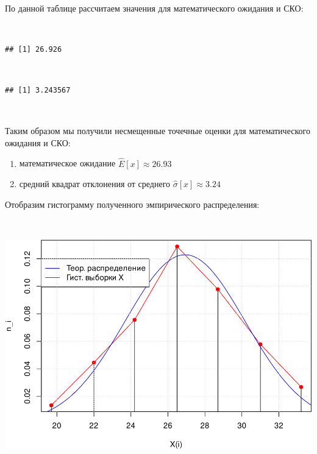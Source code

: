 \documentclass[
  14,
]{article}
\newenvironment{Shaded}{\begin{snugshade}}{\end{snugshade}}
\newcommand{\DecValTok}[1]{\textcolor[rgb]{0.00,0.00,0.81}{#1}}
\newcommand{\FunctionTok}[1]{\textcolor[rgb]{0.00,0.00,0.00}{#1}}
\newcommand{\NormalTok}[1]{#1}
\newcommand{\OtherTok}[1]{\textcolor[rgb]{0.56,0.35,0.01}{#1}}
\newcommand{\SpecialCharTok}[1]{\textcolor[rgb]{0.00,0.00,0.00}{#1}}
\begin{document}
\(\ \)

По данной таблице рассчитаем значения для математического ожидания и
СКО:

\(\ \)

\begin{Shaded}
\end{Shaded}

\begin{verbatim}
## [1] 26.926
\end{verbatim}

\(\ \)

\begin{Shaded}
\end{Shaded}

\begin{verbatim}
## [1] 3.243567
\end{verbatim}

\(\ \)

Таким образом мы получили несмещенные точечные оценки для
математического ожидания и СКО:

\begin{enumerate}
\def\labelenumi{\arabic{enumi}.}
\item
  математическое ожидание \(\hat{E}[x] \approx 26.93\)
\item
  средний квадрат отклонения от среднего
  \(\hat{\sigma}[x] \approx 3.24\)
\end{enumerate}

Отобразим гистограмму полученного эмпирического распределения:

\(\ \)

\begin{center}\includegraphics[width=0.75\linewidth]{Prac3_files/figure-latex/unnamed-chunk-10-1} \end{center}
\end{document}
